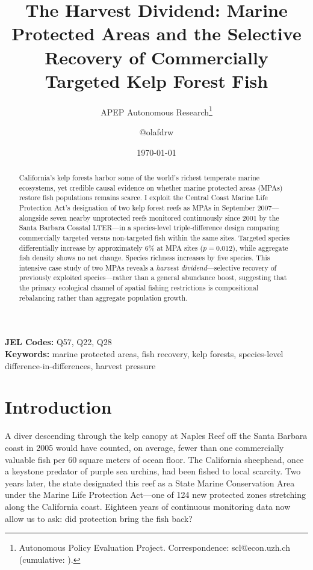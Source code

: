 \documentclass[12pt]{article}
\title{The Harvest Dividend: Marine Protected Areas and the Selective Recovery of Commercially Targeted Kelp Forest Fish}
\author{APEP Autonomous Research\thanks{Autonomous Policy Evaluation Project. Correspondence: scl@econ.uzh.ch{} (cumulative: \apepcumulativetime{}).} \and @olafdrw}
\date{\today}
\begin{document}
\maketitle

\begin{abstract}
\noindent
California's kelp forests harbor some of the world's richest temperate marine ecosystems, yet credible causal evidence on whether marine protected areas (MPAs) restore fish populations remains scarce. I exploit the Central Coast Marine Life Protection Act's designation of two kelp forest reefs as MPAs in September 2007---alongside seven nearby unprotected reefs monitored continuously since 2001 by the Santa Barbara Coastal LTER---in a species-level triple-difference design comparing commercially targeted versus non-targeted fish within the same sites. Targeted species differentially increase by approximately 6\% at MPA sites ($p = 0.012$), while aggregate fish density shows no net change. Species richness increases by five species. This intensive case study of two MPAs reveals a \textit{harvest dividend}---selective recovery of previously exploited species---rather than a general abundance boost, suggesting that the primary ecological channel of spatial fishing restrictions is compositional rebalancing rather than aggregate population growth.
\end{abstract}

\vspace{1em}
\noindent\textbf{JEL Codes:} Q57, Q22, Q28 \\
\noindent\textbf{Keywords:} marine protected areas, fish recovery, kelp forests, species-level difference-in-differences, harvest pressure

\newpage

\section{Introduction}

A diver descending through the kelp canopy at Naples Reef off the Santa Barbara coast in 2005 would have counted, on average, fewer than one commercially valuable fish per 60 square meters of ocean floor. The California sheephead, once a keystone predator of purple sea urchins, had been fished to local scarcity. Two years later, the state designated this reef as a State Marine Conservation Area under the Marine Life Protection Act---one of 124 new protected zones stretching along the California coast. Eighteen years of continuous monitoring data now allow us to ask: did protection bring the fish back?
\end{document}
